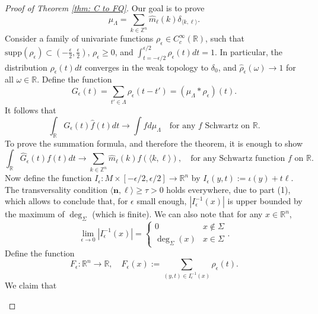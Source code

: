 \documentclass[11pt,letterpaper]{amsart}
\theoremstyle{definition}
\theoremstyle{plain}
\newcommand{\nfield}{\mathbf n}
\newcommand{\R}{{\mathbb R}}
\newcommand{\Z}{{\mathbb Z}}
\begin{document}
\begin{proof}[Proof of Theorem \ref{thm: C to FQ}]
Our goal is to prove 
\[\hat{\mu}_{\Lambda}=\sum_{k\in\Z^n}\widehat{m}_{\ell}(k)\delta_{\langle k,\ell\rangle}.\]
Consider a family of univariate functions $\rho_{\epsilon}\in C_{c}^{\infty}(\R)$, such that $\mathrm{supp}(\rho_{\epsilon})\subset (-\frac{\epsilon}{2},\frac{\epsilon}{2})$, $\rho_{\epsilon}\ge 0$, and $\int_{t=-\epsilon/2}^{\epsilon/2}\rho_{\epsilon}(t)dt=1$. In particular, the distribution $\rho_{\epsilon}(t)dt$ converges in the weak topology to $\delta_{0}$, and $\hat{\rho}_{\epsilon}(\omega)\to 1$ for all $\omega\in\R$. Define the function 
\[G_{\epsilon}(t)=\sum_{t'\in\Lambda}\rho_{\epsilon}(t-t')=(\mu_{\Lambda}*\rho_{\epsilon})(t).\]
It follows that 
\[\int_{\R}G_{\epsilon}(t)\hat{f}(t)dt\to\int \hat{f}d\mu_{\Lambda}\quad\text{for any $f$ Schwartz on $\R$}.\]  
To prove the summation formula, and therefore the theorem, it is enough to show 
\[\int_{\R}\widehat{G}_{\epsilon}(t){f}(t)dt\to \sum_{k\in\Z^n}\widehat{m}_{\ell}(k){f}(\langle k,\ell\rangle),\quad\text{for any Schwartz function $f$ on $\R$}.\]
Now define the function $I_\epsilon\colon M\times[-\epsilon/2,\epsilon/2]\to\R^n$ by $I_\epsilon(y,t):=\iota(y)+t\ell$. The transversality condition $\langle\nfield,\ell\rangle\ge \tau> 0$ holds everywhere, due to part (1), which allows to conclude that, for $\epsilon$ small enough, $|I_\epsilon^{-1}(x)|$ is upper bounded by the maximum of $\deg_{\Sigma}$ (which is finite). We can also note that for any $x\in\R^n$,
\[\lim_{\epsilon\to 0}|I_\epsilon^{-1}(x)|=\begin{cases}
    0 &  x\notin\Sigma\\
    \deg_{\Sigma}(x) & x\in\Sigma
\end{cases}.\]
Define the function 
\[F_{\epsilon}\colon\R^n\to\R,\quad F_{\epsilon}(x):=\sum_{(y,t)\in I_{\epsilon}^{-1}(x)}\rho_{\epsilon}(t).\]
We claim that
\begin{enumerate}
    

\end{enumerate}
\end{proof}
\end{document}
